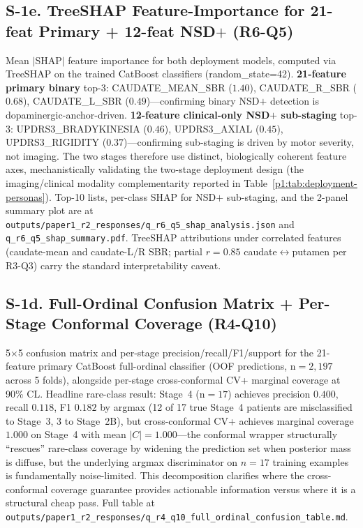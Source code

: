 \subsection*{S-1e. TreeSHAP Feature-Importance for 21-feat Primary + 12-feat NSD$+$ (R6-Q5)}
\label{p1:sec:supp:shap}

Mean $|$SHAP$|$ feature importance for both deployment models, computed via TreeSHAP on the trained CatBoost classifiers (random\_state=42). \textbf{21-feature primary binary} top-3: CAUDATE\_MEAN\_SBR ($1.40$), CAUDATE\_R\_SBR ($0.68$), CAUDATE\_L\_SBR ($0.49$)---confirming binary NSD$+$ detection is dopaminergic-anchor-driven. \textbf{12-feature clinical-only NSD$+$ sub-staging} top-3: UPDRS3\_BRADYKINESIA ($0.46$), UPDRS3\_AXIAL ($0.45$), UPDRS3\_RIGIDITY ($0.37$)---confirming sub-staging is driven by motor severity, not imaging. The two stages therefore use distinct, biologically coherent feature axes, mechanistically validating the two-stage deployment design (the imaging/clinical modality complementarity reported in Table~\ref{p1:tab:deployment-personas}). Top-10 lists, per-class SHAP for NSD$+$ sub-staging, and the 2-panel summary plot are at \texttt{outputs/paper1\_r2\_responses/q\_r6\_q5\_shap\_analysis.json} and \texttt{q\_r6\_q5\_shap\_summary.pdf}. TreeSHAP attributions under correlated features (caudate-mean and caudate-L/R SBR; partial $r{=}0.85$ caudate$\leftrightarrow$putamen per R3-Q3) carry the standard interpretability caveat.

\subsection*{S-1d. Full-Ordinal Confusion Matrix + Per-Stage Conformal Coverage (R4-Q10)}
\label{p1:sec:supp:fullordinal-confusion}

5$\times$5 confusion matrix and per-stage precision/recall/F1/support for the 21-feature primary CatBoost full-ordinal classifier (OOF predictions, n${=}2{,}197$ across 5 folds), alongside per-stage cross-conformal CV+ marginal coverage at 90\% CL. Headline rare-class result: Stage~4 (n${=}17$) achieves precision $0.400$, recall $0.118$, F1 $0.182$ by argmax (12 of 17 true Stage~4 patients are misclassified to Stage~3, 3 to Stage~2B), but cross-conformal CV+ achieves marginal coverage $1.000$ on Stage~4 with mean $|C|{=}1.000$---the conformal wrapper structurally ``rescues'' rare-class coverage by widening the prediction set when posterior mass is diffuse, but the underlying argmax discriminator on $n{=}17$ training examples is fundamentally noise-limited. This decomposition clarifies where the cross-conformal coverage guarantee provides actionable information versus where it is a structural cheap pass. Full table at \texttt{outputs/paper1\_r2\_responses/q\_r4\_q10\_full\_ordinal\_confusion\_table.md}.


